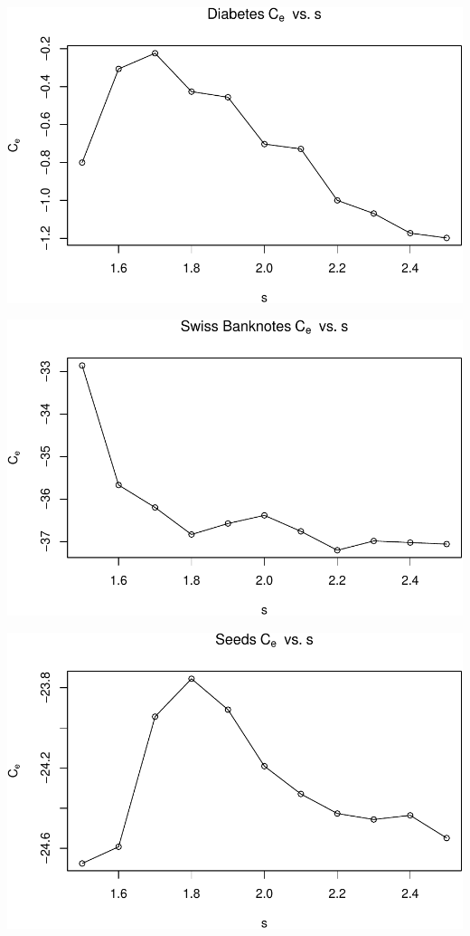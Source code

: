 \begin{center}\includegraphics[width=1\linewidth]{Report_files/figure-latex/unnamed-chunk-26-3} \end{center}

\begin{center}\includegraphics[width=1\linewidth]{Report_files/figure-latex/unnamed-chunk-26-4} \end{center}

\begin{center}\includegraphics[width=1\linewidth]{Report_files/figure-latex/unnamed-chunk-26-5} \end{center}

